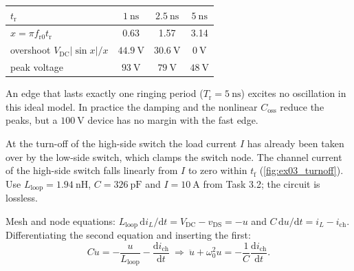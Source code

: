 \begin{solutionblock}
	\begin{solutiontable}[ht]
		\centering
		\begin{tabular}{lccc}
			\toprule
			$t_\mathrm{r}$                    & $\SI{1}{\nano\second}$ & $\SI{2.5}{\nano\second}$ & $\SI{5}{\nano\second}$ \\
			\midrule
			$x=\pi f_\mathrm{r0}t_\mathrm{r}$ & 0.63                   & 1.57                     & 3.14                   \\
			overshoot $V_\mathrm{DC}|\sin x|/x$ & $\SI{44.9}{\volt}$   & $\SI{30.6}{\volt}$       & $\SI{0}{\volt}$        \\
			peak voltage                      & $\SI{93}{\volt}$       & $\SI{79}{\volt}$         & $\SI{48}{\volt}$       \\
			\bottomrule
		\end{tabular}
		\caption{Turn-on overshoot without damping.}
		\label{stable:ex03_turnon}
	\end{solutiontable}
	An edge that lasts exactly one ringing period ($T_\mathrm{r}=\SI{5}{\nano\second}$) excites no oscillation in this ideal model. In practice the damping and the nonlinear $C_\mathrm{oss}$ reduce the peaks, but a $\SI{100}{\volt}$ device has no margin with the fast edge.
\end{solutionblock}



At the turn-off of the high-side switch the load current $I$ has already been taken over by the low-side switch, which clamps the switch node. The channel current of the high-side switch falls linearly from $I$ to zero within $t_\mathrm{f}$ (\autoref{fig:ex03_turnoff}). Use $L_\mathrm{loop}=\SI{1.94}{\nano\henry}$, $C=\SI{326}{\pico\farad}$ and $I=\SI{10}{\ampere}$ from Task 3.2; the circuit is lossless.




\begin{solutionblock}
	Mesh and node equations: $L_\mathrm{loop}\,\mathrm{d}i_L/\mathrm{d}t=V_\mathrm{DC}-v_\mathrm{DS}=-u$ and $C\,\mathrm{d}u/\mathrm{d}t=i_L-i_\mathrm{ch}$. Differentiating the second equation and inserting the first:
	\begin{equation}
		C\ddot{u} = -\frac{u}{L_\mathrm{loop}} - \frac{\mathrm{d}i_\mathrm{ch}}{\mathrm{d}t}
		\ \Rightarrow\ \ddot{u}+\omega_0^2u = -\frac{1}{C}\frac{\mathrm{d}i_\mathrm{ch}}{\mathrm{d}t}.
	\end{equation}
\end{solutionblock}

